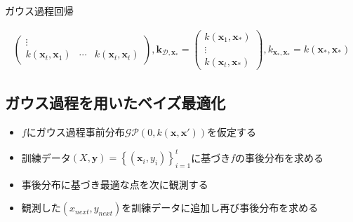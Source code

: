 \documentclass[dvipdfmx, 10.5pt]{beamer}
\begin{document}
\begin{frame}{\insertsubsection}
\begin{block}{ガウス過程回帰}
\begin{tiny}
\begin{align*}
\begin{pmatrix}
				\vdots \\ 	 
				k(\bm x_{ t}, \bm x_{ 1}) &
				\cdots &
				k(\bm x_{ t}, \bm x_{t}) 
			\end{pmatrix},
			\bm k_{\mathcal{D} ,{\bm x}_\ast}
			=
			\begin{pmatrix}
				k(\bm x_{ 1}, \bm x_\ast) \\
				\vdots \\
				k(\bm x_{ t}, \bm x_\ast) 
			\end{pmatrix},		 %
			k_{{\bm x}_\ast, {\bm x}_\ast}
			=
			k(\bm x_{\ast}, \bm x_{\ast})
		\end{align*}
	\end{tiny}
\end{block}
\end{frame}



\subsection{ガウス過程を用いたベイズ最適化}
\begin{frame}{\insertsubsection}
	\begin{itemize}
		\item $f$にガウス過程事前分布$\mathcal{GP}(0, k(\bm x, \bm x'))$を仮定する
		\item 訓練データ$(X, \bm y) = \left\{ (\bm x_i, y_i) \right\}_{i=1}^t$に基づき$f$の事後分布を求める
		\item 事後分布に基づき\alert{最適な点}を次に観測する
		\item 観測した$(x_{next}, y_{next})$を訓練データに追加し再び事後分布を求める
	\end{itemize}




\end{frame}

\end{document}
